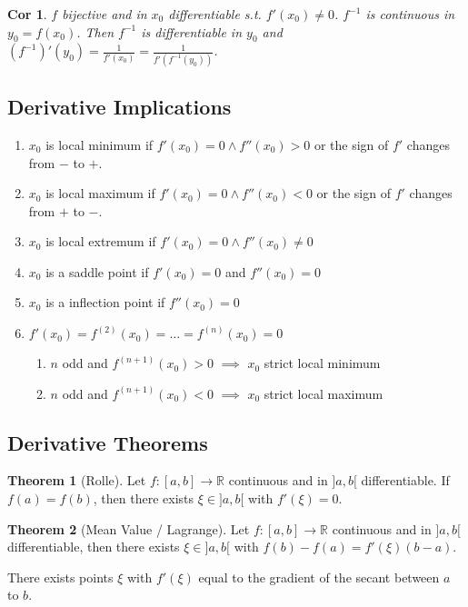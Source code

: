 \documentclass[a4paper, 10pt]{article}
\newtheorem*{corollary}{Cor}
\theoremstyle{definition}
\theoremstyle{named}
\newtheorem*{ntheorem_wrapper}{Theorem}
\newenvironment{ntheorem}%
    {\begin{mdframed}[style=important]\begin{ntheorem_wrapper}}%
    {\end{ntheorem_wrapper}\end{mdframed}}
\newcommand{\R}{\mathbb{R}}
\begin{document}
\begin{corollary}
    $f$ bijective and in $x_0$ differentiable s.t. $f'(x_0) \neq 0$. $f^{-1}$ is continuous in $y_0 = f(x_0)$. Then $f^{-1}$ is differentiable in $y_0$ and $(f^{-1})'(y_0) = \frac{1}{f'(x_0)} = \frac{1}{f'(f^{-1}(y_0))}$. 
\end{corollary}

\subsection{Derivative Implications}
\begin{enumerate}
    \item $x_0$ is local minimum if $f'(x_0) = 0 \land f''(x_0) > 0$ or the sign of $f'$ changes from $-$ to $+$.
    \item $x_0$ is local maximum if $f'(x_0) = 0 \land f''(x_0) < 0$ or the sign of $f'$ changes from $+$ to $-$.
    \item $x_0$ is local extremum if $f'(x_0) = 0 \land f''(x_0) \neq 0$
    \item $x_0$ is a saddle point if $f'(x_0) = 0$ and $f''(x_0) = 0$
    \item $x_0$ is a inflection point if $f''(x_0) = 0$
    \item $f'(x_0) = f^{(2)}(x_0) = \ldots = f^{(n)}(x_0) = 0$
    \begin{enumerate}
        \item $n$ odd and $f^{(n+1)}(x_0) > 0$ $\implies$ $x_0$ strict local minimum
        \item $n$ odd and $f^{(n+1)}(x_0) < 0$ $\implies$ $x_0$ strict local maximum
    \end{enumerate}
\end{enumerate}

\subsection{Derivative Theorems}
\begin{ntheorem}[Rolle]
    Let $f: [a, b] \to \R$ continuous and in $]a, b[$ differentiable. If $f(a) = f(b)$, then there exists $\xi \in ]a, b[$ with $f'(\xi) = 0$.
\end{ntheorem}

\begin{ntheorem}[Mean Value / Lagrange]
    Let $f: [a, b] \to \R$ continuous and in $]a, b[$ differentiable, then there exists $\xi \in ]a, b[$ with $f(b) - f(a) = f'(\xi)(b-a)$.

    There exists points $\xi$ with $f'(\xi)$ equal to the gradient of the secant between $a$ to $b$.
\end{ntheorem}
\end{document}

